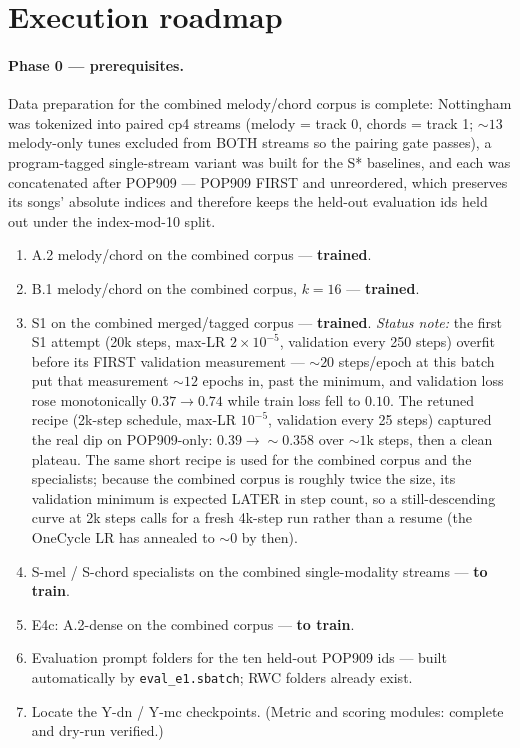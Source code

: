 \documentclass[11pt]{article}
\newcommand{\code}[1]{\texttt{#1}}
\begin{document}
\section{Execution roadmap}

\paragraph{Phase 0 --- prerequisites.} Data preparation for the
combined melody/chord corpus is complete: Nottingham was tokenized into
paired cp4 streams (melody = track 0, chords = track 1; ${\sim}13$
melody-only tunes excluded from BOTH streams so the pairing gate
passes), a program-tagged single-stream variant was built for the S*
baselines, and each was concatenated after POP909 --- POP909 FIRST and
unreordered, which preserves its songs' absolute indices and therefore
keeps the held-out evaluation ids held out under the index-mod-10 split.
\begin{enumerate}[nosep]
  \item A.2 melody/chord on the combined corpus --- \textbf{trained}.
  \item B.1 melody/chord on the combined corpus, $k{=}16$ ---
    \textbf{trained}.
  \item S1 on the combined merged/tagged corpus --- \textbf{trained}.
    \emph{Status note:} the first S1 attempt (20k steps, max-LR
    $2{\times}10^{-5}$, validation every 250 steps) overfit before its
    FIRST validation measurement --- ${\sim}20$ steps/epoch at this
    batch put that measurement ${\sim}12$ epochs in, past the minimum,
    and validation loss rose monotonically $0.37 \rightarrow 0.74$
    while train loss fell to $0.10$. The retuned recipe (2k-step
    schedule, max-LR $10^{-5}$, validation every 25 steps) captured the
    real dip on POP909-only: $0.39 \rightarrow {\sim}0.358$ over
    ${\sim}1$k steps, then a clean plateau. The same short recipe is
    used for the combined corpus and the specialists; because the
    combined corpus is roughly twice the size, its validation minimum
    is expected LATER in step count, so a still-descending curve at 2k
    steps calls for a fresh 4k-step run rather than a resume (the
    OneCycle LR has annealed to ${\sim}0$ by then).
  \item S-mel / S-chord specialists on the combined single-modality
    streams --- \textbf{to train}.
  \item E4c: A.2-dense on the combined corpus --- \textbf{to train}.
  \item Evaluation prompt folders for the ten held-out POP909 ids ---
    built automatically by \code{eval\_e1.sbatch}; RWC folders already
    exist.
  \item Locate the Y-dn / Y-mc checkpoints. (Metric and scoring
    modules: complete and dry-run verified.)
\end{enumerate}
\end{document}
